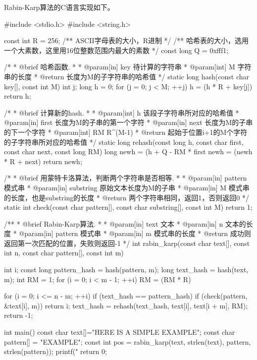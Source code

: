 Rabin-Karp算法的C语言实现如下。
\begin{Codex}[label=rabin_karp.c]
#include <stdio.h>
#include <string.h>

const int R = 256;  /** ASCII字母表的大小，R进制 */
/** 哈希表的大小，选用一个大素数，这里用16位整数范围内最大的素数 */
const long Q = 0xfff1;

/*
 * @brief 哈希函数.
 *
 * @param[in] key 待计算的字符串
 * @param[int] M 字符串的长度
 * @return 长度为M的子字符串的哈希值
 */
static long hash(const char key[], const int M) {
    int j;
    long h = 0;
    for (j = 0; j < M; ++j) h = (h * R + key[j]) %
    return h;
}

/*
 * @brief 计算新的hash.
 *
 * @param[int] h 该段子字符串所对应的哈希值
 * @param[in] first 长度为M的子串的第一个字符
 * @param[in] next 长度为M的子串的下一个字符
 * @param[int] RM R^(M-1) %
 * @return 起始于位置i+1的M个字符的子字符串所对应的哈希值
 */
static long rehash(const long h, const char first, const char next, 
                   const long RM) {
    long newh = (h + Q - RM * first %
    newh = (newh * R + next) %
    return newh;
}

/*
 * @brief 用蒙特卡洛算法，判断两个字符串是否相等.
 * 
 * @param[in] pattern 模式串
 * @param[in] substring 原始文本长度为M的子串
 * @param[in] M 模式串的长度，也是substring的长度
 * @return 两个字符串相同，返回1，否则返回0
 */
static int check(const char pattern[], const char substring[], const int M) {
    return 1;
}

/**
 * @brief Rabin-Karp算法.
 *
 * @param[in] text 文本
 * @param[in] n 文本的长度
 * @param[in] pattern 模式串
 * @param[in] m 模式串的长度
 * @return 成功则返回第一次匹配的位置，失败则返回-1
 */
int rabin_karp(const char text[], const int n, 
               const char pattern[], const int m) {
    int i;
    const long pattern_hash = hash(pattern, m);
    long text_hash = hash(text, m);
    int RM = 1;
    for (i = 0; i < m - 1; ++i) RM = (RM * R) %

    for (i = 0; i <= n - m; ++i) {
        if (text_hash == pattern_hash) {
            if (check(pattern, &text[i], m)) return i;
        }
        text_hash = rehash(text_hash, text[i], text[i + m], RM);
    }
    return -1;
}


int main() {
    const char text[]="HERE IS A SIMPLE EXAMPLE";
    const char pattern[] = "EXAMPLE";
    const int pos = rabin_karp(text, strlen(text), pattern, strlen(pattern));
    printf("%
    return 0;
}
\end{Codex}


